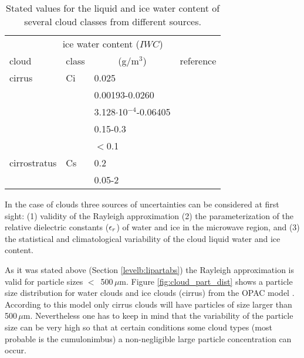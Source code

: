 \begin{table}[!htb]
\begin{center}
\begin{tabular}{llll}
\multicolumn{4}{c}{ice water content ($IWC$)}  \\
 cloud        & class & \multicolumn{1}{c}{(g/m$^3$)} & reference\\
\hline
 cirrus       & Ci    & 0.025                         & \cite{salby:96}\\
              &       & 0.00193-0.0260                & \cite{hess:98}\\
              &       & 3.128$\cdot$10$^{-4}$-0.06405 & \cite{abreu:96}\\ 
              &       & 0.15-0.3                      & \cite{larsenetal:98}\\
              &       & $<$0.1                        & \cite{berton:00}\\
cirrostratus  & Cs    & 0.2                           & \cite{salby:96}\\
              &       & 0.05-2                        & \cite{berton:00}\\
\hline
\end{tabular}
\caption{Stated values for the liquid and ice water content of several 
  cloud classes from different sources.}
\label{tab:lwc}
\end{center}
\end{table}



\label{levelb:ref_uncert_clouds}
In the case of clouds three sources of uncertainties can be considered
at first sight: (1) validity of the Rayleigh approximation (2) the 
parameterization of the relative dielectric constants ($\epsilon_r$) of water 
and ice in the microwave region, and (3) the statistical and
climatological variability of the cloud liquid water and ice content.

As it was stated above (Section \ref{levelb:lipartabs}) the Rayleigh 
approximation is valid for particle sizes $<$~500\,$\mu$m. Figure 
\ref{fig:cloud_part_dist} shows a particle size distribution for water
clouds and ice clouds (cirrus) from the OPAC model \citep{hess:98}. 
According to this model only cirrus clouds will have particles of size
larger than 500\,$\mu$m. Nevertheless one has to keep in mind that the
variability of the particle size can be very high so that at certain 
conditions some cloud types (most probable is the cumulonimbus) 
a non-negligible large particle concentration can occur.

